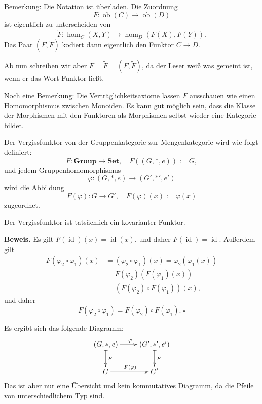 \documentclass{beamer}
\newcommand{\id}{\operatorname{id}}
\newcommand{\ob}{\operatorname{ob}}
\newcommand{\strong}[1]{\textsf{\textbf{#1}}}
\renewcommand{\qedsymbol}{\ensuremath{\square}}
\begin{document}
\begin{frame}
Bemerkung: Die Notation ist überladen. Die Zuordnung
\[F\colon\ob(C)\to\ob(D)\]
ist eigentlich zu unterscheiden von
\[\tilde F\colon\hom_C(X,Y)\to\hom_D(F(X),F(Y)).\]
Das Paar $(F,\tilde F)$ kodiert dann eigentlich den Funktor $C\to D$.

\vspace{1em}
Ab nun schreiben wir aber $F=\tilde F=(F,\tilde F)$, da der Leser
weiß was gemeint ist, wenn er das Wort Funktor ließt.
\end{frame}

\begin{frame}
Noch eine Bemerkung: Die Verträglichkeitsaxiome lassen $F$ ausschauen wie einen
Homomorphismus zwischen Monoiden. Es kann gut möglich
sein, dass die Klasse der Morphismen mit den Funktoren als
Morphismen selbst wieder eine Kategorie bildet.
\end{frame}


\begin{frame}
Der Vergissfunktor von der Gruppenkategorie zur Mengenkategorie wird
wie folgt definiert:
\[F\colon\mathbf{Group}\to\mathbf{Set},\quad F((G,*,e)):=G,\]
und jedem Gruppenhomomorphismus
\[\varphi\colon (G,*,e)\to (G',*',e')\]
wird die Abbildung
\[F(\varphi)\colon G\to G',\quad F(\varphi)(x):=\varphi(x)\]
zugeordnet.
\end{frame}

\begin{frame}
Der Vergissfunktor ist tatsächlich ein kovarianter Funktor.

\vspace{1em}
\strong{Beweis.}
Es gilt $F(\id)(x)=\id(x)$, und daher $F(\id)=\id$. Außerdem gilt
\begin{align*}
F(\varphi_2\circ\varphi_1)(x) &= (\varphi_2\circ\varphi_1)(x)
= \varphi_2(\varphi_1(x))\\
&= F(\varphi_2)(F(\varphi_1)(x))\\
&= (F(\varphi_2)\circ F(\varphi_1))(x),
\end{align*}
und daher
\[F(\varphi_2\circ\varphi_1) = F(\varphi_2)\circ F(\varphi_1).\;\qedsymbol\]
\end{frame}

\begin{frame}
Es ergibt sich das folgende Diagramm:
\[\xymatrix{(G,*,e) \ar[r]^\varphi \ar@{|->}[d]^F & \ar@{|->}[d]^F (G',*',e')\\
G \ar[r]^{F(\varphi)} & G'}
\]
Das ist aber nur eine Übersicht und kein kommutatives Diagramm, da
die Pfeile von unterschiedlichem Typ sind.
\end{frame}
\end{document}
